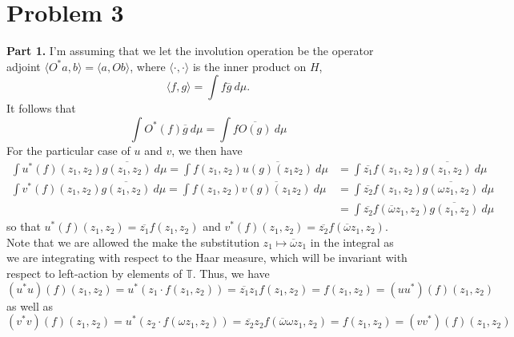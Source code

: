 \documentclass[aps,pra,showpacs,notitlepage,onecolumn,superscriptaddress,nofootinbib]{revtex4-1}
\newcommand{\hhrulefill}{\hspace{-1.0em}\hrulefill}
\theoremstyle{definition}
\begin{document}
    \hhrulefill

    \section{Problem 3}

    \noindent \textbf{Part 1.} I'm assuming that we let the involution operation be the operator adjoint $\langle O^{*} a, b \rangle = \langle a, Ob\rangle$, where
    $\langle \cdot, \cdot \rangle$ is the inner product on $H$,
    \begin{equation}
      \langle f, g \rangle = \displaystyle\int f \overline{g} \ d\mu.
    \end{equation}
    It follows that
    \begin{equation}
      \displaystyle\int O^{*}(f) \overline{g} \ d\mu = \displaystyle\int f \overline{O(g)} \ d\mu
    \end{equation}
    For the particular case of $u$ and $v$, we then have
    \begin{align}
      \displaystyle\int u^{*}(f)(z_1, z_2) \overline{g(z_1, z_2)} \ d\mu = \displaystyle\int f(z_1, z_2) \overline{u(g)(z_1 z_2)} \ d\mu &= \displaystyle\int \overline{z_1} f(z_1, z_2) \overline{g(z_1, z_2)} \ d\mu
      \\
      \displaystyle\int v^{*}(f)(z_1, z_2) \overline{g(z_1, z_2)} \ d\mu = \displaystyle\int f(z_1, z_2) \overline{v(g)(z_1 z_2)} \ d\mu &= \displaystyle\int \overline{z_2} f(z_1, z_2) \overline{g(\omega z_1, z_2)} \ d\mu
      \\ & = \displaystyle\int \overline{z_2} f(\overline{\omega} z_1, z_2) \overline{g(z_1, z_2)} \ d\mu
    \end{align}
    so that $u^{*}(f)(z_1, z_2) = \overline{z_1} f(z_1, z_2)$ and $v^{*}(f)(z_1, z_2) = \overline{z_2} f(\overline{\omega} z_1, z_2)$. Note that we are allowed the make the substitution $z_1 \mapsto \overline{\omega} z_1$ in the
    integral as we are integrating with respect to the Haar measure, which will be invariant with respect to left-action by elements of $\mathbb{T}$. Thus, we have
    \begin{equation}
      (u^{*} u)(f)(z_1, z_2) = u^{*} \left( z_1 \cdot f(z_1, z_2) \right) = \overline{z_1} z_1 f(z_1, z_2) = f(z_1, z_2) = (u u^{*})(f)(z_1, z_2)
    \end{equation}
    as well as
    \begin{equation}
      (v^{*} v)(f)(z_1, z_2) = u^{*} \left( z_2 \cdot f(\omega z_1, z_2) \right) = \overline{z_2} z_2 f(\overline{\omega} \omega z_1, z_2) = f(z_1, z_2) = (v v^{*})(f)(z_1, z_2)
      \end{equation}
\end{document}
